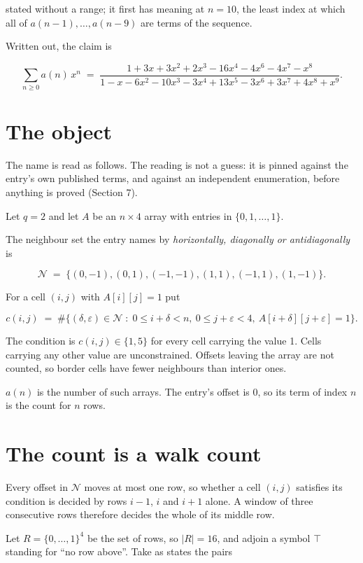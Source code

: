 \documentclass[11pt]{article}
\theoremstyle{definition}
\begin{document}
stated without a range; it first has meaning at $n = 10$, the least index at which all of $a(n-1),\dots,a(n-9)$ are terms of the sequence.

Written out, the claim is

\[\sum_{n \ge 0} a(n)\,x^n \;=\; \frac{1 + 3x + 3x^{2} + 2x^{3} - 16x^{4} - 4x^{6} - 4x^{7} - x^{8}}{1 - x - 6x^{2} - 10x^{3} - 3x^{4} + 13x^{5} - 3x^{6} + 3x^{7} + 4x^{8} + x^{9}}.\]

\section{The object}

The name is read as follows. The reading is not a guess: it is pinned against the entry's own published terms, and against an independent enumeration, before anything is proved (Section 7).

Let $q = 2$ and let $A$ be an $n \times 4$ array with entries in $\{0,1,\dots,1\}$.

The neighbour set the entry names by {\itshape horizontally, diagonally or antidiagonally} is

\[\mathcal{N} \;=\; \{(0,-1), (0,1), (-1,-1), (1,1), (-1,1), (1,-1)\}.\]

For a cell $(i,j)$ with $A[i][j] = 1$ put

\[c(i,j) \;=\; \#\bigl\{(\delta,\varepsilon)\in\mathcal{N} \;:\; 0\le i+\delta<n,\ 0\le j+\varepsilon<4,\ A[i+\delta][j+\varepsilon] = 1\bigr\}.\]

The condition is $c(i,j) \in \{1, 5\}$ for every cell carrying the value 1. Cells carrying any other value are unconstrained. Offsets leaving the array are not counted, so border cells have fewer neighbours than interior ones.

$a(n)$ is the number of such arrays. The entry's offset is 0, so its term of index $n$ is the count for $n$ rows.

\section{The count is a walk count}

Every offset in $\mathcal{N}$ moves at most one row, so whether a cell $(i,j)$ satisfies its condition is decided by rows $i-1$, $i$ and $i+1$ alone. A window of three consecutive rows therefore decides the whole of its middle row.

Let $R = \{0,\dots,1\}^{4}$ be the set of rows, so $|R| = 16$, and adjoin a symbol $\top$ standing for ``no row above''. Take as states the pairs
\end{document}
